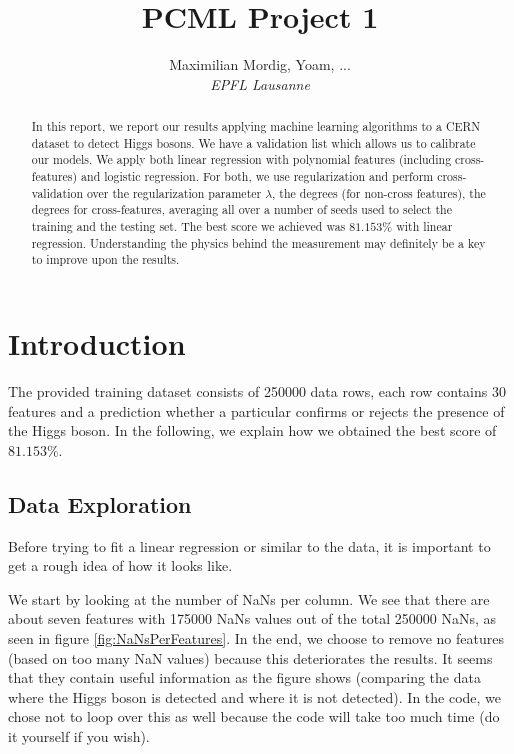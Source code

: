 \documentclass[10pt,conference,compsocconf]{IEEEtran}
\begin{document}
\title{PCML Project 1}

\author{
  Maximilian Mordig, Yoam, ...\\
  \textit{EPFL Lausanne}
}

\maketitle

\begin{abstract}
  In this report, we report our results applying machine learning algorithms to a CERN dataset to detect Higgs bosons. We have a validation list which allows us to calibrate our models. We apply both linear regression with polynomial features (including cross-features) and logistic regression. For both, we use regularization and perform cross-validation over the regularization parameter $\lambda$, the degrees (for non-cross features), the degrees for cross-features, averaging all over a number of seeds used to select the training and the testing set. The best score we achieved was $81.153\%$ with linear regression. Understanding the physics behind the measurement may definitely be a key to improve upon the results.
\end{abstract}

\section{Introduction}

The provided training dataset consists of 250000 data rows, each row contains 30 features and a prediction whether a particular confirms or rejects the presence of the Higgs boson. In the following, we explain how we obtained the best score of $81.153\%$.

\subsection{Data Exploration}
Before trying to fit a linear regression or similar to the data, it is important to get a rough idea of how it looks like. 

We start by looking at the number of NaNs per column. We see that there are about seven features with 175000 NaNs values out of the total 250000 NaNs, as seen in figure \ref{fig:NaNsPerFeatures}. In the end, we choose to remove no features (based on too many NaN values) because this deteriorates the results. It seems that they contain useful information as the figure shows (comparing the data where the Higgs boson is detected and where it is not detected). In the code, we chose not to loop over this as well because the code will take too much time (do it yourself if you wish).
\end{document}
